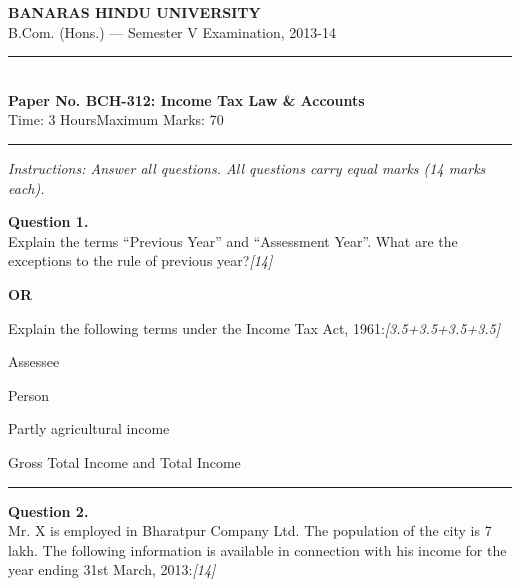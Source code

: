 \documentclass[11pt,a4paper]{article}
\newcommand{\pts}[1]{\hfill   \textit{[#1]}}
\begin{document}
\begin{center}
  {\large\bfseries BANARAS HINDU UNIVERSITY}\\[2pt]
  {\normalsize B.Com. (Hons.) --- Semester V Examination, 2013-14}\\[6pt]
  \rule{0.8\linewidth}{0.5pt}\\[6pt]
  {\large\bfseries Paper No. BCH-312: Income Tax Law \& Accounts}\\[4pt]
  {\normalsize Time: 3 Hours\hfill Maximum Marks: 70}
\end{center}

\rule{\linewidth}{0.4pt}

\smallskip



\noindent   \textit{Instructions: Answer all questions. All questions carry equal marks (14 marks each).}

\bigskip




\noindent   \textbf{Question 1.} \\
Explain the terms ``Previous Year'' and ``Assessment Year''. What are the exceptions to the rule of previous year?\pts{14}

\centerline{   \textbf{OR}}

Explain the following terms under the Income Tax Act, 1961:\pts{3.5+3.5+3.5+3.5}

\begin{parts}
  \item Assessee
  \item Person
  \item Partly agricultural income
  \item Gross Total Income and Total Income
\end{parts}

\medskip\rule{\linewidth}{0.2pt}

\pagebreak




\noindent   \textbf{Question 2.} \\
Mr. X is employed in Bharatpur Company Ltd. The population of the city is 7 lakh. The following information is available in connection with his income for the year ending 31st March, 2013:\pts{14}
\end{document}
